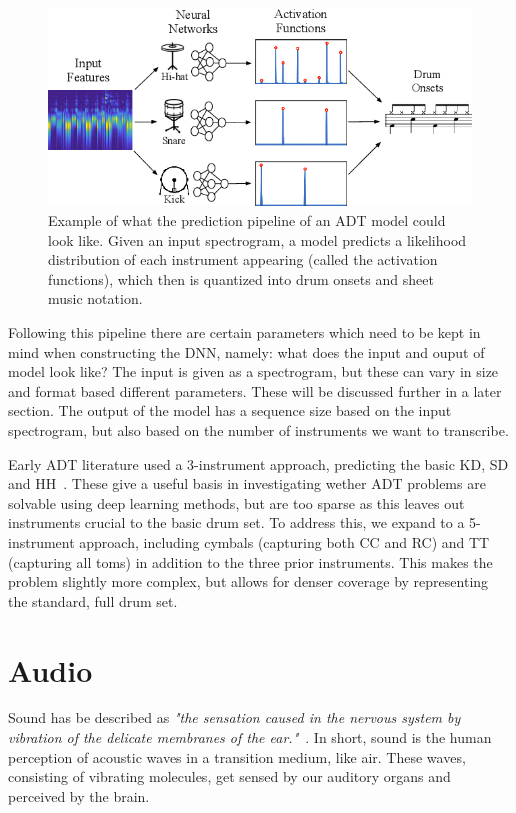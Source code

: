 \begin{figure}[H]
    \centering
    \includegraphics[scale=0.7]{figures/adtpipeline.png}
    \caption{Example of what the prediction pipeline of an \gls{ADT} model could look like. Given an input spectrogram, a model predicts a likelihood distribution of each instrument appearing (called the activation functions), which then is quantized into drum onsets and sheet music notation.}
    \label{ADTFigure}
\end{figure}

Following this pipeline there are certain parameters which need to be kept in mind when constructing the \gls{DNN}, namely: what does the input and ouput of model look like? The input is given as a spectrogram, but these can vary in size and format based different parameters. These will be discussed further in a later section. The output of the model has a sequence size based on the input spectrogram, but also based on the number of instruments we want to transcribe.

Early \gls{ADT} literature used a 3-instrument approach, predicting the basic \acrfull{KD}, \acrfull{SD} and \acrfull{HH}~\cite{vogl2016recurrent}. These give a useful basis in investigating wether \gls{ADT} problems are solvable using deep learning methods, but are too sparse as this leaves out instruments crucial to the basic drum set. To address this, we expand to a 5-instrument approach, including cymbals (capturing both \acrfull{CC} and \acrfull{RC}) and \acrfull{TT} (capturing all toms) in addition to the three prior instruments. This makes the problem slightly more complex, but allows for denser coverage by representing the standard, full drum set.

\section{Audio}

Sound has be described as \textit{"the sensation caused in the nervous system by vibration of the delicate membranes of the ear."}~\cite{1953fundamentals}. In short, sound is the human perception of acoustic waves in a transition medium, like air. These waves, consisting of vibrating molecules, get sensed by our auditory organs and perceived by the brain. 

